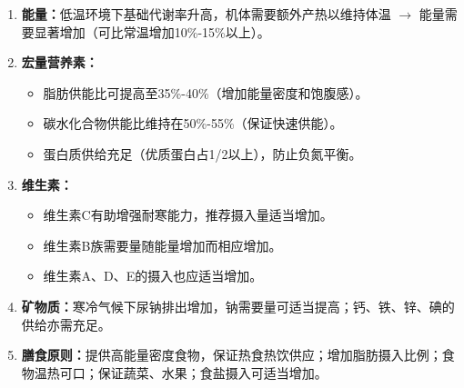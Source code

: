 \begin{tipbox}
\begin{enumerate}[leftmargin=*]
    \item \textbf{能量：}低温环境下基础代谢率升高，机体需要额外产热以维持体温 $\rightarrow$ 能量需要显著增加（可比常温增加10\%-15\%以上）。
    \item \textbf{宏量营养素：}
    \begin{itemize}[leftmargin=*]
        \item 脂肪供能比可提高至35\%-40\%（增加能量密度和饱腹感）。
        \item 碳水化合物供能比维持在50\%-55\%（保证快速供能）。
        \item 蛋白质供给充足（优质蛋白占1/2以上），防止负氮平衡。
    \end{itemize}
    \item \textbf{维生素：}
    \begin{itemize}[leftmargin=*]
        \item 维生素C有助增强耐寒能力，推荐摄入量适当增加。
        \item 维生素B族需要量随能量增加而相应增加。
        \item 维生素A、D、E的摄入也应适当增加。
    \end{itemize}
    \item \textbf{矿物质：}寒冷气候下尿钠排出增加，钠需要量可适当提高；钙、铁、锌、碘的供给亦需充足。
    \item \textbf{膳食原则：}提供高能量密度食物，保证热食热饮供应；增加脂肪摄入比例；食物温热可口；保证蔬菜、水果；食盐摄入可适当增加。
\end{enumerate}
\end{tipbox}

